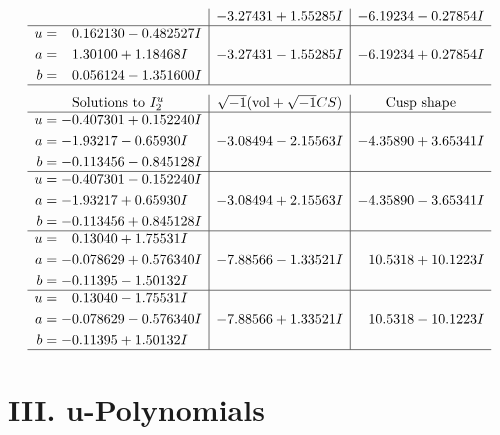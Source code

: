 \documentclass[1p]{elsarticle_modified}
\theoremstyle{definition}
\newcommand{\I}{\sqrt{-1}}
\begin{document}
$$\begin{array}{c|c|c}
 & -3.27431 + 1.55285 I & -6.19234 - 0.27854 I \\ \hline\begin{aligned}
u &= \phantom{-}0.162130 - 0.482527 I \\
a &= \phantom{-}1.30100 + 1.18468 I \\
b &= \phantom{-}0.056124 - 1.351600 I\end{aligned}
 & -3.27431 - 1.55285 I & -6.19234 + 0.27854 I\\
 \hline 
 \end{array}$$\newpage$$\begin{array}{c|c|c}  
\text{Solutions to }I^u_{2}& \I (\text{vol} + \sqrt{-1}CS) & \text{Cusp shape}\\
 \hline 
\begin{aligned}
u &= -0.407301 + 0.152240 I \\
a &= -1.93217 - 0.65930 I \\
b &= -0.113456 - 0.845128 I\end{aligned}
 & -3.08494 - 2.15563 I & -4.35890 + 3.65341 I \\ \hline\begin{aligned}
u &= -0.407301 - 0.152240 I \\
a &= -1.93217 + 0.65930 I \\
b &= -0.113456 + 0.845128 I\end{aligned}
 & -3.08494 + 2.15563 I & -4.35890 - 3.65341 I \\ \hline\begin{aligned}
u &= \phantom{-}0.13040 + 1.75531 I \\
a &= -0.078629 + 0.576340 I \\
b &= -0.11395 - 1.50132 I\end{aligned}
 & -7.88566 - 1.33521 I & \phantom{-}10.5318 + 10.1223 I \\ \hline\begin{aligned}
u &= \phantom{-}0.13040 - 1.75531 I \\
a &= -0.078629 - 0.576340 I \\
b &= -0.11395 + 1.50132 I\end{aligned}
 & -7.88566 + 1.33521 I & \phantom{-}10.5318 - 10.1223 I\\
 \hline 
 \end{array}$$\newpage
\newpage\renewcommand{\arraystretch}{1}
\centering \section*{ III. u-Polynomials}
\end{document}
